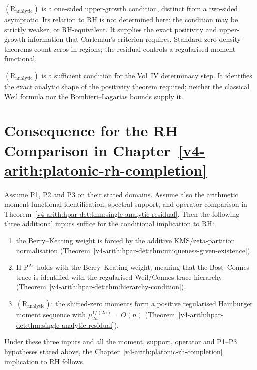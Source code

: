 \begin{remark}
\label{v4-arith:hpar-det:rem:residual-content}
\((\mathrm{R}_{\mathrm{analytic}})\) is a one-sided upper-growth
condition, distinct from a two-sided asymptotic. Its relation to RH is
not determined here: the condition may be strictly weaker, or
RH-equivalent. It supplies the exact
positivity and upper-growth information that Carleman's
criterion requires. Standard zero-density theorems count zeros in regions;
the residual controls a regularised moment functional.
\end{remark}

\begin{remark}
\label{v4-arith:hpar-det:rem:residual-vs-RH}
\((\mathrm{R}_{\mathrm{analytic}})\) is a sufficient condition for the Vol~IV
determinacy step. It identifies the exact analytic shape of
the positivity theorem required; neither the classical Weil formula
nor the Bombieri--Lagarias bounds supply it.
\end{remark}

\section{Consequence for the RH Comparison in Chapter~\ref{v4-arith:platonic-rh-completion}}
\label{v4-arith:hpar-det:ch37-consequence}

\begin{theorem}
\label{v4-arith:hpar-det:thm:ch37-consequence}
Assume P1, P2 and P3 on their stated domains. Assume also the
arithmetic moment-functional identification, spectral support, and
operator comparison in
Theorem~\ref{v4-arith:hpar-det:thm:single-analytic-residual}.
Then the following three additional inputs suffice for the
conditional implication to RH:
\begin{enumerate}
\item the Berry--Keating weight is forced by the additive
KMS/zeta-partition normalisation
(Theorem~\ref{v4-arith:hpar-det:thm:uniqueness-given-existence}).
\item H-P\(^{\mathrm{Ar}}\) holds with the Berry--Keating weight,
meaning that the Bost--Connes trace is identified with the
regularised Weil/Connes trace hierarchy
(Theorem~\ref{v4-arith:hpar-det:thm:hierarchy-condition}).
\item \((\mathrm{R}_{\mathrm{analytic}})\): the shifted-zero moments
form a positive regularised Hamburger moment sequence with
\(\mu_{2n}^{1/(2n)}=O(n)\)
(Theorem~\ref{v4-arith:hpar-det:thm:single-analytic-residual}).
\end{enumerate}
Under these three inputs and all the moment, support, operator
and P1--P3 hypotheses stated above, the
Chapter~\ref{v4-arith:platonic-rh-completion} implication to RH follows.
\end{theorem}


